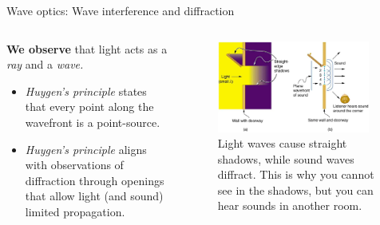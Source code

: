 \documentclass{beamer}
\begin{document}
\begin{frame}{Wave optics: Wave interference and diffraction}
\begin{columns}[T]
\begin{column}{0.5\textwidth}
\small
\textbf{We observe} that light acts as a \textit{ray} and a \textit{wave.}
\begin{itemize}
\item \textit{Huygen's principle} states that every point along the wavefront is a point-source.
\item \textit{Huygen's principle} aligns with observations of diffraction through openings that allow light (and sound) limited propagation.
\end{itemize}
\end{column}
\begin{column}{0.5\textwidth}
\begin{figure}
\centering
\includegraphics[width=0.95\textwidth]{figures/wave5.png}
\caption{\label{fig:wave5} \footnotesize Light waves cause straight shadows, while sound waves diffract.  This is why you cannot see in the shadows, but you can hear sounds in another room.}
\end{figure}
\end{column}
\end{columns}
\end{frame}
\end{document}
